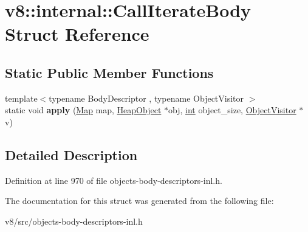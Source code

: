 \hypertarget{structv8_1_1internal_1_1CallIterateBody}{}\section{v8\+:\+:internal\+:\+:Call\+Iterate\+Body Struct Reference}
\label{structv8_1_1internal_1_1CallIterateBody}
\subsection*{Static Public Member Functions}
\begin{DoxyCompactItemize}
\item 
\mbox{\label{structv8_1_1internal_1_1CallIterateBody_a63c2783b2e4ed7ab318df4040fe8c2b9}} 
{\footnotesize template$<$typename Body\+Descriptor , typename Object\+Visitor $>$ }\\static void {\bfseries apply} (\mbox{\hyperlink{classv8_1_1internal_1_1Map}{Map}} map, \mbox{\hyperlink{classv8_1_1internal_1_1HeapObject}{Heap\+Object}} $\ast$obj, \mbox{\hyperlink{classint}{int}} object\+\_\+size, \mbox{\hyperlink{classv8_1_1internal_1_1ObjectVisitor}{Object\+Visitor}} $\ast$v)
\end{DoxyCompactItemize}


\subsection{Detailed Description}


Definition at line 970 of file objects-\/body-\/descriptors-\/inl.\+h.



The documentation for this struct was generated from the following file\+:\begin{DoxyCompactItemize}
\item 
v8/src/objects-\/body-\/descriptors-\/inl.\+h\end{DoxyCompactItemize}
